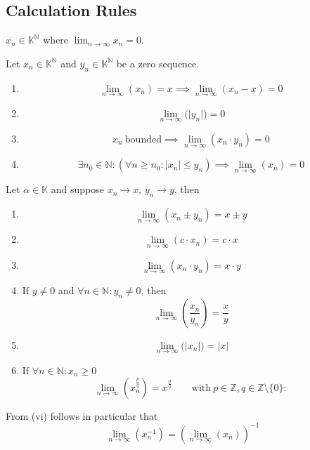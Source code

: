 \subsection{Calculation Rules}
\begin{definition}
   \(x_n \in \mathbb{K}^\mathbb{N}\) where \(\lim_{n \to \infty} x_n = 0\).
\end{definition}

\begin{lemma}\label{lem:zero_seq}
   Let \(x_n \in \mathbb{K}^\mathbb{N}\) and \(y_n \in \mathbb{K}^\mathbb{N}\) be a zero sequence.
   \begin{enumerate}[label=\roman*, align=Center]
      \item \[\lim_{n \to \infty}(x_n) = x \implies \lim_{n \to \infty} (x_n - x) = 0\]
      \item \[\lim_{n \to \infty}\big(\lvert y_n\rvert\big) = 0\]
      \item \[x_n~\text{bounded} \implies \lim_{n \to \infty} (x_n \cdot y_n) = 0\]
      \item \[\exists n_0 \in \mathbb{N}: (\forall n \geq n_0: |x_n| \leq y_n) \implies \lim_{n \to \infty}(x_n) = 0\]
   \end{enumerate}
\end{lemma}

\begin{proposition}\label{pro:seq_limit_rules}
   Let \(\alpha \in \mathbb{K}\) and suppose \(x_n \to x\), \(y_n \to y\), then
   \begin{enumerate}[label=\roman*, align=Center]
      \item \[\lim_{n \to \infty}(x_n \pm y_n) = x \pm y\]
      \item \[\lim_{n \to \infty}(c \cdot x_n) = c \cdot x\]
      \item \[\lim_{n \to \infty}(x_n \cdot y_n) = x \cdot y\]
      \item If \(y \neq 0\) and \(\forall n \in \mathbb{N}: y_n \neq 0\), then
         \[\lim_{n \to \infty} \left(\frac{x_n}{y_n}\right) = \frac{x}{y}\]
      \item \[\lim_{n \to \infty}\big(\lvert x_n\rvert\big) = \lvert x \rvert\]
      \item If \(\forall n \in \mathbb{N}: x_n \geq 0\)
         \[\lim_{n \to \infty} \left(x_n^{\frac{p}{q}}\right) = x^{\frac{p}{q}} \qquad\text{with}~p \in \mathbb{Z}, q \in \mathbb{Z} \setminus \{0\}: \]
   \end{enumerate}
\end{proposition}
\begin{remark}
   From (vi) follows in particular that
   \[\lim_{n \to \infty}(x_n^{-1}) = \left(\lim_{n \to \infty}(x_n)\right)^{-1}\]
\end{remark}


